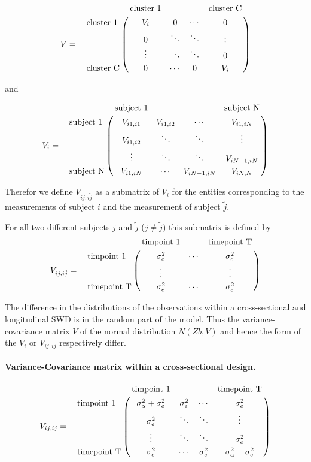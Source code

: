 \documentclass{article}
\begin{document}
\begin{eqnarray*}
V &=&  \bordermatrix{
        			&\textrm{cluster 1}	&	& 	&\textrm{cluster C}\cr
\textrm{cluster 1} 	& V_{i}	&0			&\cdots		& 0\cr
 					&0 		& \ddots	&\ddots		& \vdots \cr
 					&\vdots &\ddots		&\ddots		&0  \cr
\textrm{cluster C}	&0 		&\cdots		&	0		& V_{i}\cr
}
\end{eqnarray*}

and 

\begin{eqnarray*}
V_{i} &=&  \bordermatrix{
  					&\textrm{subject 1}	&	& 	&\textrm{subject N}\cr
\textrm{subject 1} 	& V_{i1, i1}		&V_{i1 , i2}			&\cdots		& V_{i1 , iN}\cr
 					&V_{i1 , i2}		& \ddots	&\ddots		& \vdots \cr
 					&\vdots &\ddots		&\ddots		&V_{iN-1 , iN}  \cr
\textrm{subject N}	&V_{i1 , iN} 		&\cdots		&	V_{iN-1 , iN}		& V_{iN, N}\cr
}
\end{eqnarray*}

Therefor we define $V_{ij , i\tilde{j}}$ as a submatrix of $V_{i}$ for the entities corresponding 
to the measurements of subject $i$ and the measurement of subject $\tilde{j}$.



For all two different subjects $j$ and $\tilde{j}$ ($j\neq \tilde{j}$) this submatrix is defined by
\begin{eqnarray*}
V_{ij , i\tilde{j}} &=&  \bordermatrix{
						&\textrm{timpoint 1}	& 			&\textrm{timepoint T}\cr
\textrm{timpoint 1} 	& \sigma_{e}^2			&\cdots		& \sigma_{e}^2\cr
 						&\vdots 				&			&\vdots		  \cr
\textrm{timepoint T}	&\sigma_{e}^2 			&\cdots		& \sigma_{e}^2\cr
}
\end{eqnarray*}

The difference in the distributions of the observations within a cross-sectional and longitudinal SWD is 
in the random part of the model.  
Thus the variance-covariance matrix $V$ of the normal distribution $N\left(Zb, V\right)$ and hence the form of the $V_i$ or $V_{ij , ij}$ respectively differ. 

\paragraph{Variance-Covariance matrix within a cross-sectional design.}

\begin{eqnarray*}
V_{ij , ij} &=&  \bordermatrix{
  						&\textrm{timpoint 1}	&	& 	&\textrm{timepoint T}\cr
\textrm{timpoint 1} 	&\sigma_{\alpha}^2 + \sigma_{e}^2	&\sigma_{e}^2			&\cdots		&  \sigma_{e}^2\cr
 						&\sigma_{e}^2 		& \ddots	&\ddots		& \vdots \cr
 						&\vdots &\ddots		&\ddots		&\sigma_{e}^2  \cr
\textrm{timepoint T}	&\sigma_{e}^2 		&\cdots		&	\sigma_{e}^2		& \sigma_{\alpha}^2 +  \sigma_{e}^2\cr
}
\end{eqnarray*}
\end{document}
